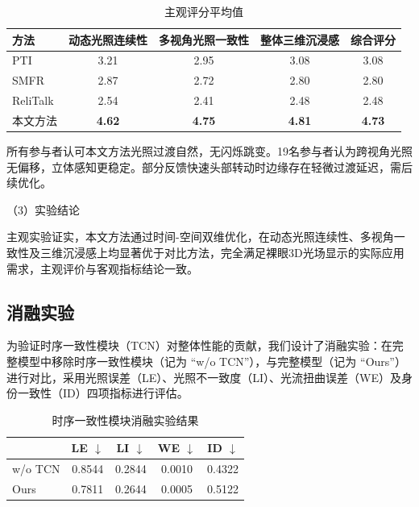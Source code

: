 \begin{table}[htbp]
  \centering
  \caption{主观评分平均值}
  \label{tab:subjective_score}
  \begin{tabular}{lcccc}
    \toprule
    方法       & 动态光照连续性 & 多视角光照一致性 & 整体三维沉浸感 & 综合评分 \\
    \midrule
    PTI        & 3.21           & 2.95             & 3.08           & 3.08     \\
    SMFR       & 2.87           & 2.72             & 2.80           & 2.80     \\
    ReliTalk   & 2.54           & 2.41             & 2.48           & 2.48     \\
    本文方法   & \textbf{4.62}           & \textbf{4.75}             & \textbf{4.81}           & \textbf{4.73}     \\
    \bottomrule
  \end{tabular}
\end{table}

所有参与者认可本文方法光照过渡自然，无闪烁跳变。19名参与者认为跨视角光照无偏移，立体感知更稳定。部分反馈快速头部转动时边缘存在轻微过渡延迟，需后续优化。

（3）实验结论

主观实验证实，本文方法通过时间-空间双维优化，在动态光照连续性、多视角一致性及三维沉浸感上均显著优于对比方法，完全满足裸眼3D光场显示的实际应用需求，主观评价与客观指标结论一致。

\subsection{消融实验}
为验证时序一致性模块（TCN）对整体性能的贡献，我们设计了消融实验：在完整模型中移除时序一致性模块（记为 “w/o TCN”），与完整模型（记为 “Ours”）进行对比，采用光照误差（LE）、光照不一致度（LI）、光流扭曲误差（WE）及身份一致性（ID）四项指标进行评估。
\begin{table}[htbp]
  \centering
  \caption{时序一致性模块消融实验结果}
  \label{tab:ablation_temporal}
  \small
  \begin{tabular*}{\textwidth}{@{\extracolsep{\fill}} lcccc @{}}
  \toprule
    & LE $\downarrow$ & LI $\downarrow$ & WE $\downarrow$ & ID $\downarrow$ \\
  \midrule
  w/o TCN & 0.8544 & 0.2844 & 0.0010 & 0.4322 \\
  Ours    & 0.7811 & 0.2644 & 0.0005 & 0.5122 \\
  \bottomrule
  \end{tabular*}
\end{table}

